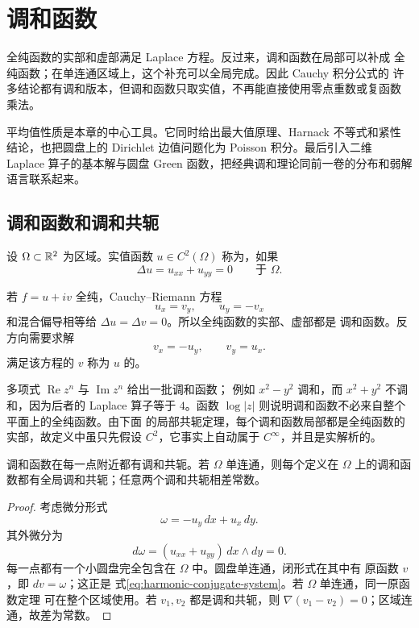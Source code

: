 \chapter{调和函数}
\label{chap:harmonic-functions}

全纯函数的实部和虚部满足 Laplace 方程。反过来，调和函数在局部可以补成
全纯函数；在单连通区域上，这个补充可以全局完成。因此 Cauchy 积分公式的
许多结论都有调和版本，但调和函数只取实值，不再能直接使用零点重数或复函数
乘法。

平均值性质是本章的中心工具。它同时给出最大值原理、Harnack 不等式和紧性
结论，也把圆盘上的 Dirichlet 边值问题化为 Poisson 积分。最后引入二维
Laplace 算子的基本解与圆盘 Green 函数，把经典调和理论同前一卷的分布和弱解
语言联系起来。

\section{调和函数和调和共轭}

\begin{definition}
设 $\Omega\subset\mathbb{R}^2$ 为区域。实值函数
$u\in C^2(\Omega)$ 称为，如果
\[
 \Delta u=u_{xx}+u_{yy}=0\qquad\text{于 }\Omega.
\]
\end{definition}

若 $f=u+iv$ 全纯，Cauchy--Riemann 方程
\[
 u_x=v_y,\qquad u_y=-v_x
\]
和混合偏导相等给 $\Delta u=\Delta v=0$。所以全纯函数的实部、虚部都是
调和函数。反方向需要求解
\begin{equation}\label{eq:harmonic-conjugate-system}
 v_x=-u_y,\qquad v_y=u_x.
\end{equation}
满足该方程的 $v$ 称为 $u$ 的。

多项式 $\operatorname{Re}z^n$ 与 $\operatorname{Im}z^n$ 给出一批调和函数；
例如 $x^2-y^2$ 调和，而 $x^2+y^2$ 不调和，因为后者的 Laplace 算子等于
$4$。函数 $\log|z|$ 则说明调和函数不必来自整个平面上的全纯函数。由下面
的局部共轭定理，每个调和函数局部都是全纯函数的实部，故定义中虽只先假设
$C^2$，它事实上自动属于 $C^\infty$，并且是实解析的。

\begin{theorem}[调和共轭]\label{thm:harmonic-conjugate}
调和函数在每一点附近都有调和共轭。若 $\Omega$ 单连通，则每个定义在
$\Omega$ 上的调和函数都有全局调和共轭；任意两个调和共轭相差常数。
\end{theorem}

\begin{proof}
考虑微分形式
\[
 \omega=-u_y\,dx+u_x\,dy.
\]
其外微分为
\[
 d\omega=(u_{xx}+u_{yy})\,dx\wedge dy=0.
\]
每一点都有一个小圆盘完全包含在 $\Omega$ 中。圆盘单连通，闭形式在其中有
原函数 $v$，即 $dv=\omega$；这正是
式\eqref{eq:harmonic-conjugate-system}。若 $\Omega$ 单连通，同一原函数定理
可在整个区域使用。若 $v_1,v_2$ 都是调和共轭，则
$\nabla(v_1-v_2)=0$；区域连通，故差为常数。
\end{proof}

